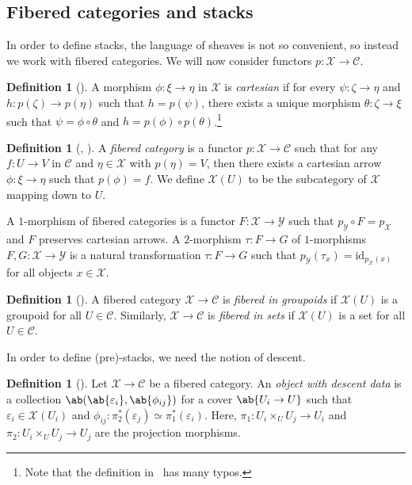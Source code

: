 \documentclass{amsart}
\theoremstyle{definition}
\newtheorem{defn}[thm]{Definition}
\theoremstyle{remark}
\theoremstyle{plain}
\theoremstyle{definition}
\theoremstyle{remark}
\newcommand{\ep}{\varepsilon}
\newcommand{\mc}[1]{\mathcal{#1}}
\newcommand{\mr}[1]{\mathrm{#1}}
\newcommand{\1}{\mathbf{1}}
\newcommand{\2}{\mathbf{2}}
\newcommand{\3}{\mathbf{3}}
\begin{document}
\subsection{Fibered categories and stacks}%


In order to define stacks, the language of sheaves is not so convenient, so instead we work with fibered categories. We will now consider functors $p \colon \mc{X} \to \mc{C}$.

\begin{defn}[{\cite[Definition 2.2.1]{fganotes}}]
    A morphism $\phi \colon \xi \to \eta$ in $\mc{X}$ is \textit{cartesian} if for every $\psi \colon \zeta \to \eta$ and $h \colon p(\zeta) \to p(\eta)$ such that $h = p(\psi)$, there exists a unique morphism $\theta \colon \zeta \to \xi$ such that $\psi = \phi \circ \theta$ and $h = p(\phi) \circ p(\theta)$.\footnote{Note that the definition in~\cite{fganotes} has many typos.}
\end{defn}


\begin{defn}[{\cite[Definition 2.2.2]{fganotes}, \cite[\href{https://stacks.math.columbia.edu/tag/02XP}{Tag 02XP}]{stacks}}]
    A \textit{fibered category} is a functor $p \colon \mc{X} \to \mc{C}$ such that for any $f \colon U \to V$ in $\mc{C}$ and $\eta \in \mc{X}$ with $p(\eta) = V$, then there exists a cartesian arrow $\phi \colon \xi \to \eta$ such that $p(\phi) = f$. We define $\mc{X}(U)$ to be the subcategory of $\mc{X}$ mapping down to $U$. 

    A $1$-morphism of fibered categories is a functor $F \colon \mc{X} \to \mc{Y}$ such that $p_{\mc{Y}} \circ F = p_{\mc{X}}$ and $F$ preserves cartesian arrows. A $2$-morphism $\tau \colon F \to G$ of $1$-morphisms $F,G \colon \mc{X} \to \mc{Y}$ is a natural transformation $\tau \colon F \to G$ such that $p_{\mc{Y}}(\tau_x) = \mr{id}_{p_{\mc{X}}(x)}$ for all objects $x \in \mc{X}$.
\end{defn}

\begin{defn}[{\cite[Definition 5.4.3]{fganotes}}]
    A fibered category $\mc{X} \to \mc{C}$ is \textit{fibered in groupoids} if $\mc{X}(U)$ is a groupoid for all $U \in \mc{C}$. Similarly, $\mc{X} \to \mc{C}$ is \textit{fibered in sets} if $\mc{X}(U)$ is a set for all $U \in \mc{C}$.
\end{defn}


In order to define (pre)-stacks, we need the notion of descent.

\begin{defn}[{\cite[Definition 6.1.3]{fganotes}}]
    Let $\mc{X} \to \mc{C}$ be a fibered category. An \textit{object with descent data} is a collection $\ab(\ab\{\ep_i\}, \ab\{\phi_{ij}\})$ for a cover $\ab\{U_i \to U \}$ such that $\ep_i \in \mc{X}(U_i)$ and $\phi_{ij} \colon \pi_2^*(\ep_j) \simeq \pi_1^*(\ep_i)$. Here, $\pi_1 \colon U_i \times_U U_j \to U_i$ and $\pi_2 \colon U_i \times_U U_j \to U_j$ are the projection morphisms.
\end{defn}
\end{document}
